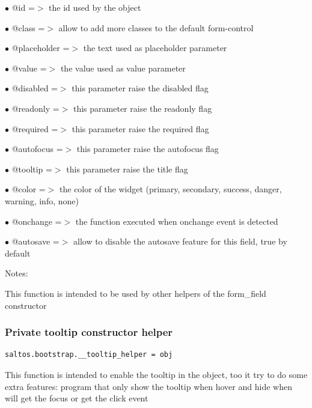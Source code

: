 \documentclass[a4paper]{article}
\begin{document}
\begin{compactitem}
\item[\color{myblue}$\bullet$] @id          =$>$ the id used by the object
\item[\color{myblue}$\bullet$] @class       =$>$ allow to add more classes to the default form-control
\item[\color{myblue}$\bullet$] @placeholder =$>$ the text used as placeholder parameter
\item[\color{myblue}$\bullet$] @value       =$>$ the value used as value parameter
\item[\color{myblue}$\bullet$] @disabled    =$>$ this parameter raise the disabled flag
\item[\color{myblue}$\bullet$] @readonly    =$>$ this parameter raise the readonly flag
\item[\color{myblue}$\bullet$] @required    =$>$ this parameter raise the required flag
\item[\color{myblue}$\bullet$] @autofocus   =$>$ this parameter raise the autofocus flag
\item[\color{myblue}$\bullet$] @tooltip     =$>$ this parameter raise the title flag
\item[\color{myblue}$\bullet$] @color       =$>$ the color of the widget (primary, secondary, success, danger, warning, info, none)
\item[\color{myblue}$\bullet$] @onchange    =$>$ the function executed when onchange event is detected
\item[\color{myblue}$\bullet$] @autosave    =$>$ allow to disable the autosave feature for this field, true by default
\end{compactitem}

Notes:

This function is intended to be used by other helpers of the form\_field constructor

\hypertarget{toc95}{}
\subsubsection{Private tooltip constructor helper}

\begin{lstlisting}
saltos.bootstrap.__tooltip_helper = obj
\end{lstlisting}

This function is intended to enable the tooltip in the object, too it try to do some
extra features: program that only show the tooltip when hover and hide when will get
the focus or get the click event
\end{document}

